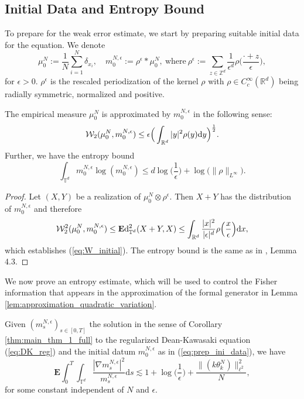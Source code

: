 \subsection{Initial Data and Entropy Bound}\label{sec:ini_data}
To prepare for the weak error estimate, we start by preparing suitable initial data for the equation. We denote
\begin{equation}\label{eq:prep_ini_data}
    \mu_0^N:= \frac{1}{N}\sum_{i=1}^N \delta_{x_i}, \quad m^{N,\epsilon}_0 := \rho^{\epsilon} \ast \mu_0^N, \ \text{where} \ \rho^{\epsilon} := \sum_{z \in \mathbb{Z}^d}\frac{1}{\epsilon^d} \rho\Big(\frac{\cdot + z}{\epsilon}\Big),
\end{equation}
for $\epsilon > 0$. $\rho^{\epsilon}$ is the rescaled periodization of the kernel $\rho$ with $\rho \in C_c^{\infty}(\mathbb{R}^d)$ being radially symmetric, normalized and positive.
\begin{lem} The empirical measure $\mu_0^N$ is approximated by $m_0^{N,\epsilon}$ in the following sense: 
\begin{align}\label{eq:W_initial}
    \mathcal{W}_2(\mu_0^N, m_0^{N,\epsilon})  \leq \epsilon\Big(\int_{\mathbb{R}^d}|y|^2\rho(y)\mathrm{d}y\Big)^{\frac{1}{2}}.
\end{align}
Further, we have the entropy bound 
\begin{equation}\label{eq:entropy_initial}
    \int_{\mathbb{T}^d} m_0^{N,\epsilon} \log(m_0^{N,\epsilon}) \leq d\log\Big(\frac{1}{\epsilon}\Big) + \log\big(\|\rho\|_{L^{\infty}}\big).
\end{equation}
\end{lem}
\begin{proof} Let $(X,Y)$ be a realization of $\mu_0^N \otimes \rho^{\epsilon}$. Then $X + Y$ has the distribution of $m_{0}^{N,\epsilon}$ and therefore
$$
\mathcal{W}^2_2(\mu_0^N, m_0^{N,\epsilon}) \leq \mathbf{E}\mathrm{d}^2_{\mathbb{T}^d}(X + Y,X) \leq \int_{\mathbb{R}^d} \frac{|x|^2}{|\epsilon|^d}\rho\Big(\frac{x}{\epsilon}\Big)\mathrm{d}x,
$$
which establishes (\ref{eq:W_initial}). The entropy bound is the same as in \cite{DKP23}, Lemma 4.3.
\end{proof}
We now prove an entropy estimate, which will be used to control the Fisher information that appears in the approximation of the formal generator in Lemma \ref{lem:approximation_quadratic_variation}. 

\begin{lem}\label{lem:entropy_DK_reg} Given $(m_s^{N,\epsilon})_{s \in [0,T]}$ the solution in the sense of Corollary \ref{thm:main_thm_1_full} to the regularized Dean-Kawasaki equation (\ref{eq:DK_reg}) and the initial datum $m_0^{N,\epsilon}$ as in (\ref{eq:prep_ini_data}), we have 
\begin{equation}\label{eq:entropy_m^Nepsilon}
 \mathbf{E}\int_0^T \int_{\mathbb{T}^d} \frac{|\nabla m_s^{N,\epsilon}|^2}{m_s^{N,\epsilon}}\mathrm{d}s  \lesssim 1 + \log\Big(\frac{1}{\epsilon}\Big) + \frac{\|(k\theta^N_k)\|^2_{\ell^2}}{N},
\end{equation}
for some constant independent of $N$ and $\epsilon$.
\end{lem}

